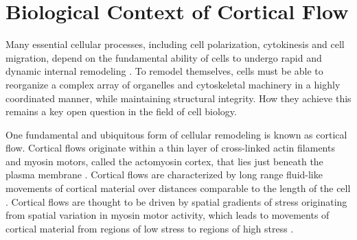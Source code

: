
\section{Biological Context of Cortical Flow}
Many essential cellular processes, including cell polarization, cytokinesis and cell migration, depend on the fundamental ability of cells to undergo rapid and dynamic internal remodeling \cite{bhl28884}. To remodel themselves, cells must be able to reorganize a complex array of organelles and cytoskeletal machinery in a highly coordinated manner, while maintaining structural integrity.  How they achieve this remains a key open question in the field of cell biology.

One fundamental and ubiquitous form of cellular remodeling is known as cortical flow.  Cortical flows originate within a thin layer of cross-linked actin filaments and myosin motors, called the actomyosin cortex, that lies just beneath the plasma membrane \cite{Munro2004413}. Cortical flows are characterized by long range fluid-like movements of cortical material over distances comparable to the length of the cell \cite{doi:10.1146/annurev-cellbio-100109-104027}.  Cortical flows are thought to be driven by spatial gradients of stress originating from spatial variation in myosin motor activity, which leads to movements of cortical material from regions of low stress to regions of high stress \cite{cellmech_flows3}.

